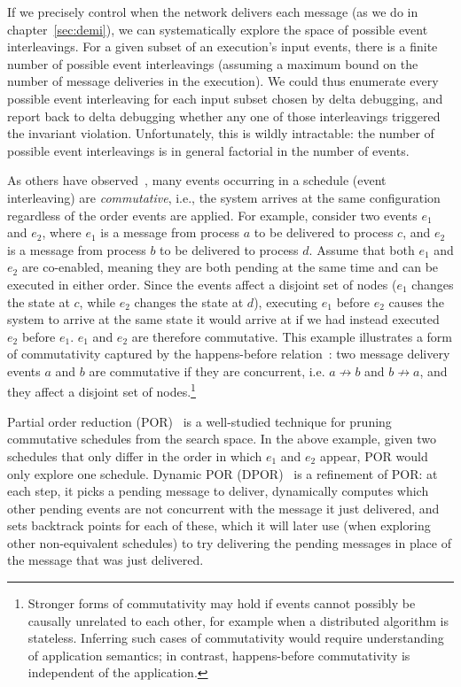 If we precisely control when the network delivers each message (as we do in
chapter~\ref{sec:demi}), we can
systematically explore the space of possible event interleavings.
For a given subset of an execution's input events, there is a finite number of
possible event interleavings (assuming a maximum bound on the number of
message deliveries in the execution). We could thus enumerate every possible
event interleaving for each input subset chosen by delta debugging,
and report back to delta debugging whether any one of those interleavings
triggered the invariant violation. Unfortunately, this is wildly intractable: the
number of possible event interleavings is in general factorial in the number
of events.

As others have observed~\cite{godefroid1995partial}, many events occurring in
a schedule (event interleaving) are {\em commutative}, i.e., the system arrives at the same
configuration regardless of the order events are applied. For example, consider two events $e_1$ and $e_2$, where
$e_1$ is a message from process $a$ to be delivered to
process $c$, and $e_2$ is a message from process $b$
to be delivered to process $d$. Assume that both $e_1$ and $e_2$ are co-enabled, meaning they are both pending at the same time and can be executed in either order. Since
the events affect a disjoint set of nodes ($e_1$ changes the state at $c$, while $e_2$ changes the state at $d$), executing $e_1$ before $e_2$ causes the system to arrive at the same state it would arrive at if we had instead executed $e_2$ before $e_1$.
$e_1$ and $e_2$ are therefore commutative. This example
illustrates a form of commutativity captured by the happens-before relation~\cite{Lamport:1978:TCO:359545.359563}: two message delivery events
$a$ and $b$ are commutative if they are concurrent, i.e. $a \not\rightarrow b$
and $b \not\rightarrow a$, and they affect a disjoint set of nodes.\footnote{
Stronger forms of
commutativity may hold if events cannot possibly be causally unrelated to each other, for
example when a distributed algorithm is stateless. Inferring such cases of
commutativity would require understanding of application semantics; in
contrast, happens-before commutativity is independent of the application.}

Partial order reduction (POR)~\cite{godefroid1995partial,flanagan2005dynamic} is a well-studied technique for pruning commutative schedules from the search space. In the above example, given two schedules that only differ in the order
in which $e_1$ and $e_2$ appear, POR would only explore one schedule. Dynamic POR (DPOR)~\cite{flanagan2005dynamic} is a
refinement of POR: at each
step, it picks a pending message to deliver, dynamically computes which
other pending events are not concurrent with the message it just delivered,
and sets backtrack points for each of these, which it will later use (when
exploring other non-equivalent schedules) to try delivering the pending
messages in place of the message that was just delivered.

